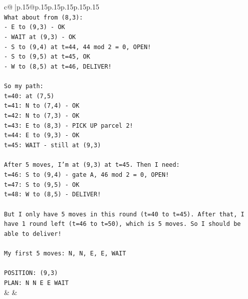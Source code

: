 \documentclass{article}
\begin{document}
{\begin{supertabular}{c@{$\;$}|p{.15\linewidth}@{}p{.15\linewidth}p{.15\linewidth}p{.15\linewidth}p{.15\linewidth}p{.15\linewidth}}
{{{\\ 
\texttt{What about from (8,3):} \\
\texttt{{-} E to (9,3) {-} OK} \\
\texttt{{-} WAIT at (9,3) {-} OK} \\
\texttt{{-} S to (9,4) at t=44, 44 mod 2 = 0, OPEN!} \\
\texttt{{-} S to (9,5) at t=45, OK} \\
\texttt{{-} W to (8,5) at t=46, DELIVER!} \\
\\ 
\texttt{So my path:} \\
\texttt{t=40: at (7,5)} \\
\texttt{t=41: N to (7,4) {-} OK} \\
\texttt{t=42: N to (7,3) {-} OK} \\
\texttt{t=43: E to (8,3) {-} PICK UP parcel 2!} \\
\texttt{t=44: E to (9,3) {-} OK} \\
\texttt{t=45: WAIT {-} still at (9,3)} \\
\\ 
\texttt{After 5 moves, I'm at (9,3) at t=45. Then I need:} \\
\texttt{t=46: S to (9,4) {-} gate A, 46 mod 2 = 0, OPEN!} \\
\texttt{t=47: S to (9,5) {-} OK} \\
\texttt{t=48: W to (8,5) {-} DELIVER!} \\
\\ 
\texttt{But I only have 5 moves in this round (t=40 to t=45). After that, I have 1 round left (t=46 to t=50), which is 5 moves. So I should be able to deliver!} \\
\\ 
\texttt{My first 5 moves: N, N, E, E, WAIT} \\
\\ 
\texttt{POSITION: (9,3)} \\
\texttt{PLAN: N N E E WAIT} \\
            }
        }
    }
    & & \\ \\


\end{supertabular}}
\end{document}
